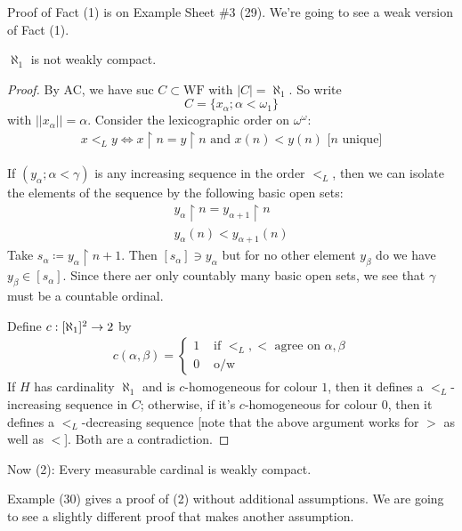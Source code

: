\documentclass[]{article}
\newcommand{\om}{\omega}
\newcommand{\wf}{\textrm{WF}}
\begin{document}

Proof of Fact (1) is on Example Sheet \#3 (29). We're going to see a weak version of Fact (1).

\begin{remark*}
    $\aleph_1$ is not weakly compact.
\end{remark*}
\begin{proof}
    By AC, we have suc $C\subset \wf$ with $|C| = \aleph_1$. So write $$ C = \{x_\alpha ; \alpha < \om_1\}$$ with $||x_\alpha || = \alpha$. Consider the lexicographic order on $\om^\om$:
    \begin{align*}
        x <_L y \iff x\restriction n = y \restriction n\textrm{ and }x(n) < y(n)\textrm{ [$n$ unique]}
    \end{align*}

    If $(y_\alpha; \alpha < \gamma)$ is any increasing sequence in the order $<_L$, then we can isolate the elements of the sequence by the following basic open sets:
    \begin{align*}
        y_\alpha \restriction n = y_{\alpha+1}\restriction n\\
        y_\alpha(n) < y_{\alpha+1}(n)
    \end{align*}
    Take $s_\alpha \coloneqq y_\alpha \restriction n+1$. Then $[s_\alpha]\ni y_\alpha$ but for no other element $y_\beta$ do we have $y_\beta \in [s_\alpha]$. Since there aer only countably many basic open sets, we see that $\gamma$ must be a countable ordinal.

    Define $c : [\aleph_1]^2 \rightarrow 2$ by
    \begin{align*}
        c(\alpha,\beta) = \left\lbrace \begin{array}{cl}1 & \textrm{ if }<_L,<\textrm{ agree on }\alpha,\beta\\ 0 & \textrm{ o/w} \end{array}\right.
    \end{align*}
    If $H$ has cardinality $\aleph_1$ and is $c$-homogeneous for colour $1$, then it defines a $<_L$-increasing sequence in $C$; otherwise, if it's $c$-homogeneous for colour $0$, then it defines a $<_L$-decreasing sequence [note that the above argument works for $>$ as well as $<$]. Both are a contradiction.
\end{proof}

Now (2): Every measurable cardinal is weakly compact.

\begin{remark*}
    Example (30) gives a proof of (2) without additional assumptions. We are going to see a slightly different proof that makes another assumption.
\end{remark*}
\end{document}

